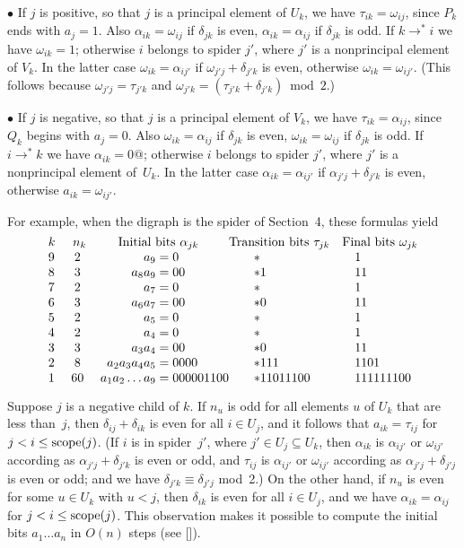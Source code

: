 \smallskip
\item{$\bullet$} If $j$ is positive, so that $j$ is a
principal element of $U_k$, we have $\tau_{ik}=\omega_{ij}$,
since $P_k$ ends with $a_j=1$.  Also
$\alpha_{ik}=\omega_{ij}$ if $\delta_{jk}$ is even,
$\alpha_{ik}=\alpha_{ij}$ if $\delta_{jk}$ is odd.  If
$k\to^*i$ we have $\omega_{ik}=1$; otherwise $i$ belongs to
spider $j'$, where $j'$ is a nonprincipal element of $V_k$.
In the latter case $\omega_{ik}=\alpha_{ij'}$ if 
$\omega_{j'j}+\delta_{j'k}$ is even, otherwise
$\omega_{ik}=\omega_{ij'}$.  (This follows because
$\omega_{j'j}=\tau_{j'k}$ and $\omega_{j'k}=(\tau_{j'k}+\delta_{j'k})\bmod
2$.)
\smallskip
\item{$\bullet$} If $j$ is negative, so that $j$ is a
principal element of $V_k$, we have $\tau_{ik}=\alpha_{ij}$,
since $Q_k$ begins with $a_j=0$.  Also
$\omega_{ik}=\alpha_{ij}$ if $\delta_{jk}$ is even,
$\omega_{ik}=\omega_{ij}$ if $\delta_{jk}$ is odd.  If
$i\to^*k$ we have $\alpha_{ik}=0@$; otherwise $i$ belongs to
spider $j'$, where $j'$ is a nonprincipal element of~$U_k$.
In the latter case $\alpha_{ik}=\alpha_{ij'}$ if 
$\alpha_{j'j}+\delta_{j'k}$ is even, otherwise
$a_{ik}=\omega_{ij'}$.

\smallskip\noindent
For example, when the digraph is the spider of Section~4,
these formulas yield
$$\vbox{\halign{#\quad&\hfil#\hfil&\quad$\hfil#={}$&#\hfil&&\qquad#\hfil\cr
$k$&$n_k$&\multispan2\hfil Initial bits $\alpha_{jk}$\hfil&
 \omit Transition bits $\tau_{jk}$&\omit\quad Final bits $\omega_{jk}$\cr
9  &  2  &         a_9&0          &           $*$      &      1            \cr
8  &  3  &       a_8a_9&00        &           $*1$     &      11           \cr
7  &  2  &         a_7&0          &           $*$      &      1            \cr
6  &  3  &       a_6a_7&00        &           $*0$     &      11           \cr
5  &  2  &         a_5&0          &           $*$      &      1            \cr
4  &  2  &         a_4&0          &           $*$      &      1            \cr
3  &  3  &       a_3a_4&00        &           $*0$      &      11           \cr
2  &  8  &    a_2a_3a_4a_5&0000   &          $*111$    &     1101          \cr
1  & 60  & a_1a_2\ldots a_9&000001100&    $*11011100$  &   111111100       \cr
}}$$

Suppose $j$ is a negative child of $k$.  If $n_u$ is odd for
all elements $u$ of $U_k$ that are less than~$j$, then
$\delta_{ij}+\delta_{ik}$ is even for all $i\in U_j$, and it
follows that $a_{ik}=\tau_{ij}$ for $j<i\le{\rm scope}(j)$.
(If $i$ is in spider~$j'$, where $j'\in U_j\subseteq U_k$, then
$\alpha_{ik}$ is $\alpha_{ij'}$ or $\omega_{ij'}$ according as
$\alpha_{j'j}+\delta_{j'k}$ is even or odd, and
$\tau_{ij}$ is $\alpha_{ij'}$ or $\omega_{ij'}$ according as
$\alpha_{j'j}+\delta_{j'j}$ is even or odd; and we have
$\delta_{j'k}\equiv\delta_{j'j}$ mod~2.)
On the other hand, if $n_u$ is even for some $u\in U_k$ with
$u<j$, then $\delta_{ik}$ is even for all $i\in U_j$, and we
have 
$\alpha_{ik}=\alpha_{ij}$ for $j<i\le{\rm scope}(j)$.  This
observation makes it possible to compute the initial bits
$a_1\ldots a_n$ in $O(n)$ steps (see [\Spiders]).

